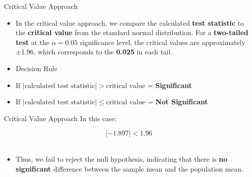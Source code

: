 \documentclass[
  ignorenonframetext,
]{beamer}
\providecommand{\tightlist}{%
  \setlength{\itemsep}{0pt}\setlength{\parskip}{0pt}}
\begin{document}
\begin{frame}{Critical Value Approach}
\label{critical-value-approach}
\begin{itemize}
\tightlist
\item
  In the critical value approach, we compare the calculated \textbf{test
  statistic} to the \textbf{critical value} from the standard normal
  distribution. For a \textbf{two-tailed test} at the \(\alpha = 0.05\)
  significance level, the critical values are approximately ±1.96, which
  corresponds to the \textbf{0.025} in each tail.
\end{itemize}

\vspace{1cm}

\begin{itemize}
\item
  Decision Rule
\item
  If \(| \text{calculated test statistic} | > \text{critical value}\) =
  \textbf{Significant}
\item
  If \(| \text{calculated test statistic} | \leq \text{critical value}\)
  = \textbf{Not Significant}
\end{itemize}
\end{frame}

\begin{frame}{Critical Value Approach}
\label{critical-value-approach-1}
In this case:

\centering

\[
|-1.897| < 1.96
\]\\

\begin{itemize}
\tightlist
\item
  Thus, we fail to reject the null hypothesis, indicating that there is
  \textbf{no significant} difference between the sample mean and the
  population mean.
\end{itemize}
\end{frame}
\end{document}
